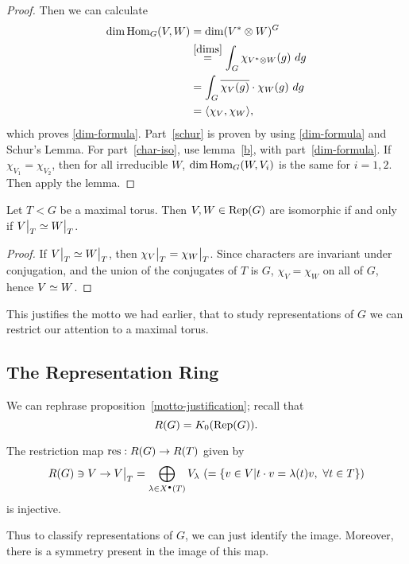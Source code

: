 \begin{proof}
Then we can calculate
\begin{align*}
\dim \operatorname{Hom}_G(V, W) & = \dim (V^* \otimes W)^G \\
& \stackrel{\ref{dims}}{=} \int_G \chi_{V^* \otimes W} (g) \ dg\\
& = \int_G \overline{\chi_V(g)} \cdot \chi_W(g) \ dg \\
& = \langle \chi_V, \chi_W \rangle,
\end{align*}
which proves \ref{dim-formula}. Part~\ref{schur} is proven by using
\ref{dim-formula} and Schur's Lemma. For part~\ref{char-iso}, use lemma~\ref{b},
with part~\ref{dim-formula}. If $\chi_{V_1} = \chi_{V_2}$, then for all
irreducible $W$, $\dim \operatorname{Hom}_G(W, V_i)$ is the same for $i = 1, 2$. Then 
apply the lemma.
\end{proof}

\begin{prop}\label{motto-justification}
Let $T < G$ be a maximal torus. Then $V, W \in \mathrm{Rep}(G)$ are isomorphic if and
only if $\restr{V}{T} \iso \restr{W}{T}$.
\end{prop}

\begin{proof}
If $\restr{V}{T} \iso \restr{W}{T}$, then
$\restr{\chi_V}{T} = \restr{\chi_W}{T}$. Since characters are invariant under
conjugation, and the union of the conjugates of $T$ is $G$, $\chi_V = \chi_W$ on
all of $G$, hence $V \simeq W$.
\end{proof}

This justifies the motto we had earlier, that to study representations of $G$ 
we can restrict our attention to a maximal torus.

\subsection{The Representation Ring}

We can rephrase proposition~\ref{motto-justification}; recall that
\[ R(G) = K_0(\mathrm{Rep}(G)). \]

\begin{prop}
The restriction map $\operatorname{res}: R(G) \rightarrow R(T)$ given by 
\[ R(G) \ni V \rightarrow \restr{V}{T}
    = \bigoplus_{\lambda \in \cgroup T} V_\lambda
    \ (= \{ v \in V | t \cdot v = \lambda(t) v, \ \forall t \in T \}) \]
is injective.
\end{prop}

Thus to classify representations of $G$, we can just identify the image.
Moreover, there is a symmetry present in the image of this map.


